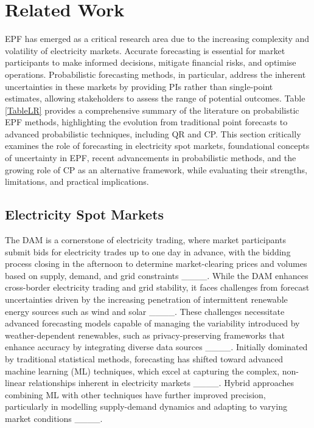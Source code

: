 \section{Related Work}
\label{pepfliteraturereview}
EPF has emerged as a critical research area due to the increasing complexity and volatility of electricity markets. Accurate forecasting is essential for market participants to make informed decisions, mitigate financial risks, and optimise operations. Probabilistic forecasting methods, in particular, address the inherent uncertainties in these markets by providing PIs rather than single-point estimates, allowing stakeholders to assess the range of potential outcomes. Table \ref{TableLR} provides a comprehensive summary of the literature on probabilistic EPF methods, highlighting the evolution from traditional point forecasts to advanced probabilistic techniques, including QR and CP. This section critically examines the role of forecasting in electricity spot markets, foundational concepts of uncertainty in EPF, recent advancements in probabilistic methods, and the growing role of CP as an alternative framework, while evaluating their strengths, limitations, and practical implications.

\subsection{Electricity Spot Markets}
The DAM is a cornerstone of electricity trading, where market participants submit bids for electricity trades up to one day in advance, with the bidding process closing in the afternoon to determine market-clearing prices and volumes based on supply, demand, and grid constraints ____. 
While the DAM enhances cross-border electricity trading and grid stability, it faces challenges from forecast uncertainties driven by the increasing penetration of intermittent renewable energy sources such as wind and solar ____. These challenges necessitate advanced forecasting models capable of managing the variability introduced by weather-dependent renewables, such as privacy-preserving frameworks that enhance accuracy by integrating diverse data sources ____. Initially dominated by traditional statistical methods, forecasting has shifted toward advanced machine learning (ML) techniques, which excel at capturing the complex, non-linear relationships inherent in electricity markets ____. Hybrid approaches combining ML with other techniques have further improved precision, particularly in modelling supply-demand dynamics and adapting to varying market conditions ____.

